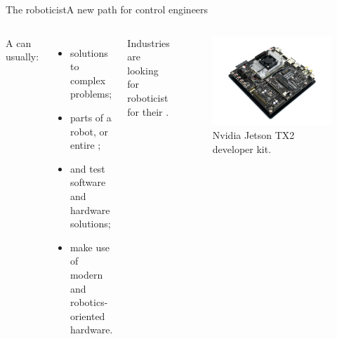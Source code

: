 \begin{frame}{The roboticist}{A new path for control engineers}
	\begin{columns}
		A  can usually:
		\begin{itemize}
			\item {} solutions to complex problems;
			\item {} parts of a robot, or entire ;
			\item {} and test software and hardware solutions;
			\item make use of modern  and robotics-oriented hardware.
		\end{itemize}
		Industries are looking for roboticist for their .

		\begin{figure}
			\centering
			\includegraphics[width=.9\textwidth]{tx2}
			\caption{Nvidia Jetson TX2 developer kit.}
			\label{fig:tx2}
		\end{figure}
	\end{columns}
\end{frame}
